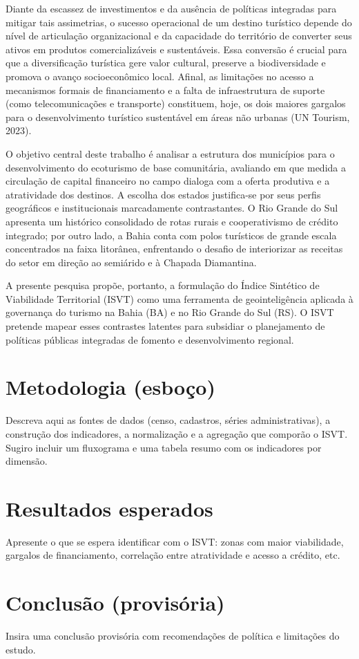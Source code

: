 \documentclass[a4paper,12pt]{article}
\begin{document}
Diante da escassez de investimentos e da ausência de políticas integradas para mitigar tais assimetrias, o sucesso operacional de um destino turístico depende do nível de articulação organizacional e da capacidade do território de converter seus ativos em produtos comercializáveis e sustentáveis. Essa conversão é crucial para que a diversificação turística gere valor cultural, preserve a biodiversidade e promova o avanço socioeconômico local. Afinal, as limitações no acesso a mecanismos formais de financiamento e a falta de infraestrutura de suporte (como telecomunicações e transporte) constituem, hoje, os dois maiores gargalos para o desenvolvimento turístico sustentável em áreas não urbanas (UN Tourism, 2023).

O objetivo central deste trabalho é analisar a estrutura dos municípios para o desenvolvimento do ecoturismo de base comunitária, avaliando em que medida a circulação de capital financeiro no campo dialoga com a oferta produtiva e a atratividade dos destinos. A escolha dos estados justifica-se por seus perfis geográficos e institucionais marcadamente contrastantes. O Rio Grande do Sul apresenta um histórico consolidado de rotas rurais e cooperativismo de crédito integrado; por outro lado, a Bahia conta com polos turísticos de grande escala concentrados na faixa litorânea, enfrentando o desafio de interiorizar as receitas do setor em direção ao semiárido e à Chapada Diamantina.

A presente pesquisa propõe, portanto, a formulação do Índice Sintético de Viabilidade Territorial (ISVT) como uma ferramenta de geointeligência aplicada à governança do turismo na Bahia (BA) e no Rio Grande do Sul (RS). O ISVT pretende mapear esses contrastes latentes para subsidiar o planejamento de políticas públicas integradas de fomento e desenvolvimento regional.

\section{Metodologia (esboço)}
Descreva aqui as fontes de dados (censo, cadastros, séries administrativas), a construção dos indicadores, a normalização e a agregação que comporão o ISVT. Sugiro incluir um fluxograma e uma tabela resumo com os indicadores por dimensão.

\section{Resultados esperados}
Apresente o que se espera identificar com o ISVT: zonas com maior viabilidade, gargalos de financiamento, correlação entre atratividade e acesso a crédito, etc.

\section{Conclusão (provisória)}
Insira uma conclusão provisória com recomendações de política e limitações do estudo.



\end{document}

